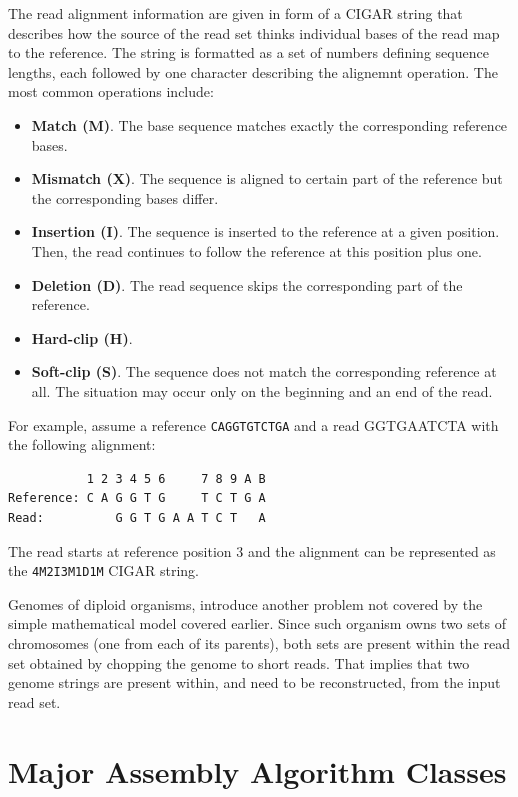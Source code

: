 The read alignment information are given in form of a CIGAR string that describes how the source of the read set thinks individual bases of the read map to the reference. The string is formatted as a set of numbers defining sequence lengths, each followed by one character describing the alignemnt operation. The most common operations include:
\begin{itemize}
\item \textbf{Match (M)}. The base sequence matches exactly the corresponding reference bases.
\item \textbf{Mismatch (X)}. The sequence is aligned to certain part of the reference but the corresponding bases differ.
\item \textbf{Insertion (I)}. The sequence is inserted to the reference at a given position. Then, the read continues to follow the reference at this position plus one.
\item \textbf{Deletion (D)}. The read sequence skips the corresponding part of the reference.
\item \textbf{Hard-clip (H)}. 
\item \textbf{Soft-clip (S)}. The sequence does not match the corresponding reference at all. The situation may occur only on the beginning and an end of the read.
\end{itemize}

For example, assume a reference \texttt{CAGGTGTCTGA} and a read GGTGAATCTA with the following alignment:
\begin{verbatim}
           1 2 3 4 5 6     7 8 9 A B
Reference: C A G G T G     T C T G A
Read:          G G T G A A T C T   A
\end{verbatim}
The read starts at reference position 3 and the alignment can be represented as the \texttt{4M2I3M1D1M} CIGAR string.

Genomes of diploid organisms, introduce another problem not covered by the simple mathematical model covered earlier. Since such organism owns two sets of chromosomes (one from each of its parents), both sets are present within the read set obtained by chopping the genome to short reads. That implies that two genome strings are present within, and need to be reconstructed, from the input read set.

\section{Major Assembly Algorithm Classes}
\label{sec:major-assembly-algorithm-classes}

